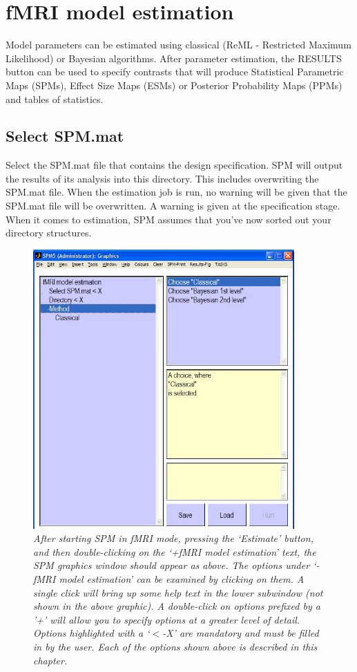 \chapter{fMRI model estimation}

Model parameters can be estimated using classical (ReML - Restricted Maximum Likelihood) or Bayesian algorithms. After parameter estimation, the RESULTS button can be used to specify contrasts that will produce Statistical Parametric Maps (SPMs), Effect Size Maps (ESMs) or Posterior Probability Maps (PPMs) and tables of statistics. 

\section{Select SPM.mat}

Select the SPM.mat file that contains the design specification. SPM will output the results of its analysis into this directory. This includes overwriting the SPM.mat file. When the estimation job is run, no warning will be given that the SPM.mat file will be overwritten. A warning is given at the specification stage. When it comes to estimation, SPM assumes that you've now sorted out your directory structures.

\begin{figure}
\begin{center}
\includegraphics[width=100mm]{fmri_est/est_method}
\end{center}
\caption{\em After starting SPM in fMRI mode, pressing the `Estimate' button, and then double-clicking on the `+fMRI model estimation' text, the SPM graphics window should appear as above. The options under `-fMRI model estimation' can be examined by clicking on them. A single click will bring up some help text in the lower subwindow (not shown in the above graphic). A double-click on options prefixed by a '+' will allow you to specify options at a greater level of detail. Options highlighted with a `$<$-X' are mandatory and must be filled in by the user. Each of the options shown above is described in this chapter. \label{est}}
\end{figure}

